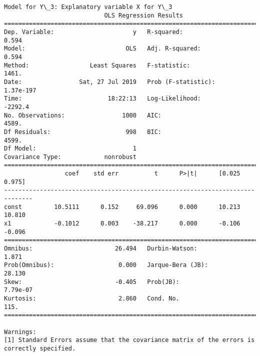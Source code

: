 \documentclass[11pt]{article}
\begin{document}
\begin{Verbatim}[commandchars=\\\{\}]
Model for Y\_3: Explanatory variable X for Y\_3
                            OLS Regression Results                            
==============================================================================
Dep. Variable:                      y   R-squared:                       0.594
Model:                            OLS   Adj. R-squared:                  0.594
Method:                 Least Squares   F-statistic:                     1461.
Date:                Sat, 27 Jul 2019   Prob (F-statistic):          1.37e-197
Time:                        18:22:13   Log-Likelihood:                -2292.4
No. Observations:                1000   AIC:                             4589.
Df Residuals:                     998   BIC:                             4599.
Df Model:                           1                                         
Covariance Type:            nonrobust                                         
==============================================================================
                 coef    std err          t      P>|t|      [0.025      0.975]
------------------------------------------------------------------------------
const         10.5111      0.152     69.096      0.000      10.213      10.810
x1            -0.1012      0.003    -38.217      0.000      -0.106      -0.096
==============================================================================
Omnibus:                       26.494   Durbin-Watson:                   1.871
Prob(Omnibus):                  0.000   Jarque-Bera (JB):               28.130
Skew:                          -0.405   Prob(JB):                     7.79e-07
Kurtosis:                       2.860   Cond. No.                         115.
==============================================================================

Warnings:
[1] Standard Errors assume that the covariance matrix of the errors is correctly specified.



\end{Verbatim}
\end{document}

